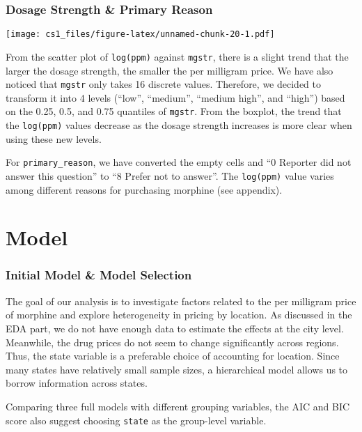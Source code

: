 \documentclass[
  11pt,
]{article}
\begin{document}
\hypertarget{dosage-strength-primary-reason}{%
\subsubsection{Dosage Strength \& Primary
Reason}\label{dosage-strength-primary-reason}}

\texttt{[image: cs1\_files/figure-latex/unnamed-chunk-20-1.pdf]}

From the scatter plot of \texttt{log(ppm)} against \texttt{mgstr}, there
is a slight trend that the larger the dosage strength, the smaller the
per milligram price. We have also noticed that \texttt{mgstr} only takes
16 discrete values. Therefore, we decided to transform it into 4 levels
(``low'', ``medium'', ``medium high'', and ``high'') based on the 0.25,
0.5, and 0.75 quantiles of \texttt{mgstr}. From the boxplot, the trend
that the \texttt{log(ppm)} values decrease as the dosage strength
increases is more clear when using these new levels.

For \texttt{primary\_reason}, we have converted the empty cells and ``0
Reporter did not answer this question'' to ``8 Prefer not to answer''.
The \texttt{log(ppm)} value varies among different reasons for
purchasing morphine (see appendix).

\hypertarget{model}{%
\section{Model}\label{model}}

\hypertarget{initial-model-model-selection}{%
\subsubsection{Initial Model \& Model
Selection}\label{initial-model-model-selection}}

The goal of our analysis is to investigate factors related to the per
milligram price of morphine and explore heterogeneity in pricing by
location. As discussed in the EDA part, we do not have enough data to
estimate the effects at the city level. Meanwhile, the drug prices do
not seem to change significantly across regions. Thus, the state
variable is a preferable choice of accounting for location. Since many
states have relatively small sample sizes, a hierarchical model allows
us to borrow information across states.

Comparing three full models with different grouping variables, the AIC
and BIC score also suggest choosing \texttt{state} as the group-level
variable.
\end{document}
